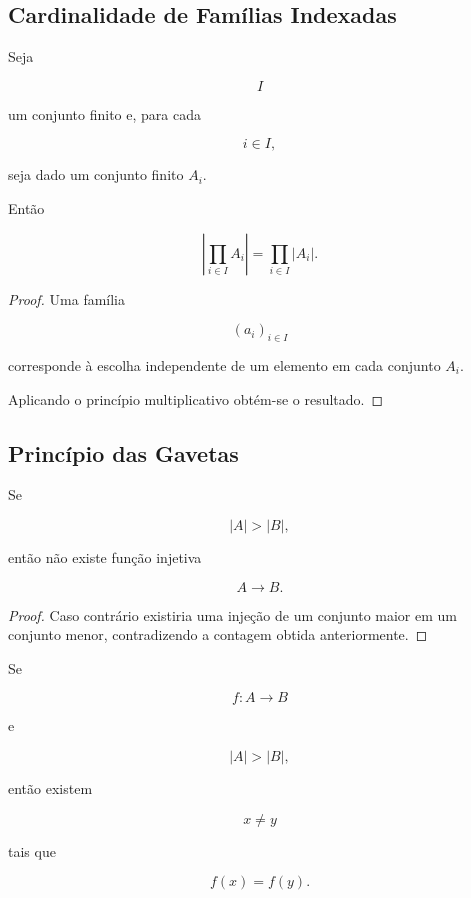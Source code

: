 \documentclass[../../main]{subfiles}
\begin{document}
\subsection{Cardinalidade de Famílias Indexadas}

\begin{prop}
	\label{prop:matematica:funcoes:cardinalidade:familias}

	Seja

	\[
		I
	\]

	um conjunto finito e, para cada

	\[
		i\in I,
	\]

	seja dado um conjunto finito \(A_i\).

	Então

	\[
		\left|
		\prod_{i\in I}
		A_i
		\right|
		=
		\prod_{i\in I}
		|A_i|.
	\]

\end{prop}

\begin{proof}

	Uma família

	\[
		(a_i)_{i\in I}
	\]

	corresponde à escolha independente de um elemento em cada conjunto
	\(A_i\).

	Aplicando o princípio multiplicativo obtém-se o resultado.

\end{proof}

\subsection{Princípio das Gavetas}

\begin{thm}
	\label{thm:matematica:funcoes:cardinalidade:gavetas}

	Se

	\[
		|A|
		>
		|B|,
	\]

	então não existe função injetiva

	\[
		A\to B.
	\]

\end{thm}

\begin{proof}

	Caso contrário existiria uma injeção de um conjunto maior em um
	conjunto menor, contradizendo a contagem obtida anteriormente.

\end{proof}

\begin{cor}

	Se

	\[
		f:A\to B
	\]

	e

	\[
		|A|>|B|,
	\]

	então existem

	\[
		x\neq y
	\]

	tais que

	\[
		f(x)=f(y).
	\]

\end{cor}
\end{document}
